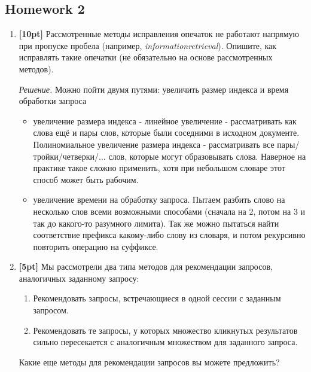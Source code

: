 \subsection*{Homework 2}

\begin{enumerate}
	\item \textbf{[10pt]} Рассмотренные методы исправления опечаток не работают напрямую при 
	пропуске пробела (например, \textit{informationretrieval}). Опишите, как исправлять такие 
	опечатки (не обязательно на основе рассмотренных методов).
	
	\textit{Решение.} Можно пойти двумя путями: увеличить размер индекса и время обработки запроса
	\begin{itemize}
		\item увеличение размера индекса - линейное увеличение - рассматривать как слова ещё и 
		пары слов, которые были соседними в исходном документе. Полиномиальное увеличение размера 
		индекса - рассматривать все пары/тройки/четверки/... слов, которые могут образовывать 
		слова. Наверное на практике такое сложно применить, хотя при небольшом словаре этот 
		способ может быть рабочим.  
		\item увеличение времени на обработку запроса. Пытаем разбить слово на несколько слов 
		всеми возможными способами (сначала на 2, потом на 3 и так до какого-то разумного 
		лимита). Так же можно пытаться найти соответствие префикса какому-либо слову из словаря, 
		и потом рекурсивно повторить операцию на суффиксе.
	\end{itemize}
	
	\item \textbf{[5pt]} Мы рассмотрели два типа методов для рекомендации запросов, аналогичных 
	заданному запросу:
	\begin{enumerate}
		\item Рекомендовать запросы, встречающиеся в одной сессии с заданным запросом.
		\item Рекомендовать те запросы, у которых множество кликнутых результатов сильно 	
		пересекается с аналогичным множеством для заданного запроса.
	\end{enumerate}

	Какие еще методы для рекомендации запросов вы можете предложить?
	

\end{enumerate}
